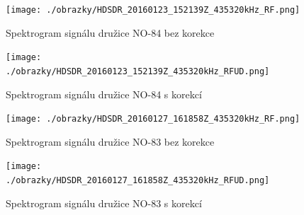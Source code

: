\begin{figure}[ht]
  \centering
  \texttt{[image: ./obrazky/HDSDR\_20160123\_152139Z\_435320kHz\_RF.png]}
  \caption{Spektrogram signálu družice NO-84 bez korekce}
  \label{fig:NO-84_raw}
\end{figure}

\begin{figure}[ht]
  \centering
  \texttt{[image: ./obrazky/HDSDR\_20160123\_152139Z\_435320kHz\_RFUD.png]}
  \caption{Spektrogram signálu družice NO-84 s korekcí}
  \label{fig:NO-84_ud}
\end{figure}

\begin{figure}[ht]
  \centering
  \texttt{[image: ./obrazky/HDSDR\_20160127\_161858Z\_435320kHz\_RF.png]}
  \caption{Spektrogram signálu družice NO-83 bez korekce}
  \label{fig:NO-83_raw}
\end{figure}

\begin{figure}[ht]
  \centering
  \texttt{[image: ./obrazky/HDSDR\_20160127\_161858Z\_435320kHz\_RFUD.png]}
  \caption{Spektrogram signálu družice NO-83 s korekcí}
  \label{fig:NO-83_ud}
\end{figure}
